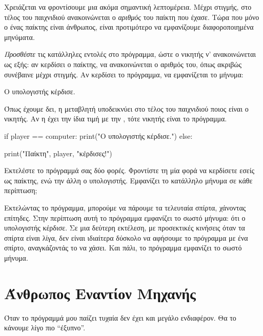 \documentclass[a4paper,11pt,oneside]{book}
\begin{document}
\begin{step}
Χρειάζεται να φροντίσουμε μια ακόμα σημαντική λεπτομέρεια. Μέχρι στιγμής, στο τέλος του παιχνιδιού ανακοινώνεται ο \emph{αριθμός} του παίκτη που έχασε. Τώρα που μόνο ο ένας παίκτης είναι άνθρωπος, είναι προτιμότερο να εμφανίζουμε διαφοροποιημένα μηνύματα.

\emph{Προσθέστε} τις κατάλληλες εντολές στο πρόγραμμα, ώστε ο νικητής ν' ανακοινώνεται ως εξής: αν κερδίσει ο παίκτης, να ανακοινώνεται ο αριθμός του, όπως ακριβώς συνέβαινε μέχρι στιγμής. Αν κερδίσει το πρόγραμμα, να εμφανίζεται το μήνυμα:

\marginnote[14pt]{\iconcomputer}
\begin{pyterm}
Ο υπολογιστής κέρδισε.
\end{pyterm}

\clearpage
\begin{answer}
Όπως έχουμε δει, η μεταβλητή  υποδεικνύει στο τέλος του παιχνιδιού ποιος είναι ο νικητής. Αν η  έχει την ίδια τιμή με την , τότε νικητής είναι το πρόγραμμα.

\begin{pynew}
if player == computer:
    print("Ο υπολογιστής κέρδισε.")
else:
\end{pynew}
\begin{pyplain}
    print("Παίκτη", player, "κέρδισες!")
\end{pyplain}
\end{answer}

Εκτελέστε το πρόγραμμά σας δύο φορές. Φροντίστε τη μία φορά να κερδίσετε εσείς ως παίκτης, ενώ την άλλη ο υπολογιστής. Εμφανίζει το κατάλληλο μήνυμα σε κάθε περίπτωση;

\begin{answer}
Εκτελώντας το πρόγραμμα, μπορούμε να πάρουμε τα τελευταία σπίρτα, χάνοντας επίτηδες. Στην περίπτωση αυτή το πρόγραμμα εμφανίζει το σωστό μήνυμα: ότι ο υπολογιστής κέρδισε. Σε μια δεύτερη εκτέλεση, με προσεκτικές κινήσεις όταν τα σπίρτα είναι λίγα, δεν είναι ιδιαίτερα δύσκολο να αφήσουμε το πρόγραμμα με ένα σπίρτο, αναγκάζοντάς το να χάσει. Και πάλι, το πρόγραμμα εμφανίζει το σωστό μήνυμα.
\end{answer}

\end{step}

\section{Άνθρωπος Εναντίον Μηχανής}
Όταν το πρόγραμμά μου παίζει τυχαία δεν έχει και μεγάλο ενδιαφέρον. Θα το κάνουμε λίγο πιο ``έξυπνο''.
\end{document}
